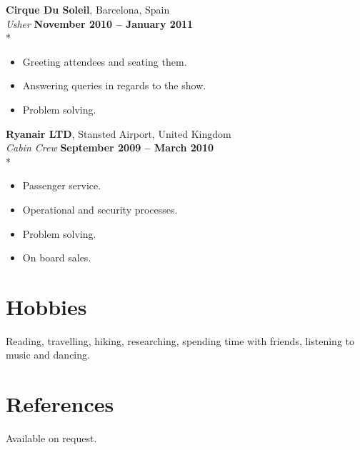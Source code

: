 \documentclass[margin,line]{resume}
\begin{document}
\begin{resume}
    \textbf{Cirque Du Soleil}, Barcelona, Spain \vspace{2mm}\\\vspace{1mm}%
    \textsl{Usher} \hfill \textbf{November 2010 -- January 2011}\\*
    \begin{itemize}
    \item Greeting attendees and seating them. 
    \item Answering queries in regards to the show. 
    \item Problem solving. 
    \end{itemize}

    \textbf{Ryanair LTD}, Stansted Airport, United Kingdom \vspace{2mm}\\\vspace{1mm}%
    \textsl{Cabin Crew} \hfill \textbf{September 2009 -- March 2010}\\*
    \begin{itemize}
    \item Passenger service. 
    \item Operational and security processes. 
    \item Problem solving. 
    \item On board sales. 
    \end{itemize}
    
 
    \section{\mysidestyle Hobbies}
    Reading, travelling, hiking, researching, spending time with friends, listening to music and dancing.

    \section{\mysidestyle References} 
    Available on request.
    


\end{resume}
\end{document}
